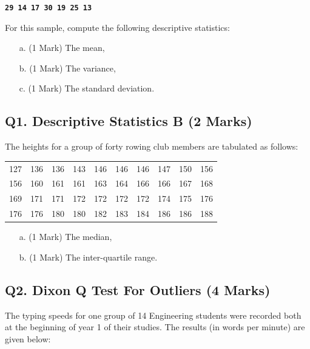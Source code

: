 \documentclass[a4paper,12pt]{article}
\begin{document}
\begin{center}
	\textbf{\texttt{29 14 17 30 19 25 13}}
\end{center}

\noindent For this sample, compute the following descriptive statistics:
\begin{itemize}
	\item[a.] (1 Mark) The mean,
	\item[b.] (1 Mark) The variance,
	\item[c.] (1 Mark) The standard deviation.
\end{itemize}

\subsection*{Q1. Descriptive Statistics B (2 Marks)} %
The heights for a group of forty rowing club members are tabulated as follows:

\begin{table}[ht]
	\begin{center}
		\begin{tabular}{|rrrrrrrrrr|}
			
			\hline
			127& 136& 136& 143& 146& 146& 146& 147& 150& 156\\
			156& 160& 161& 161& 163& 164& 166& 166& 167& 168\\
			169& 171& 171& 172& 172& 172& 172& 174& 175& 176\\
			176& 176& 180& 180& 182& 183& 184& 186& 186& 188\\
			\hline
		\end{tabular}
	\end{center}
\end{table}
\vspace{-0.5cm}
\begin{itemize}
	\item[a.] (1 Mark) The median,
	\item[b.] (1 Mark) The inter-quartile range.
\end{itemize}
\newpage

\subsection*{Q2. Dixon Q Test For Outliers (4 Marks)}



The typing speeds for one group of 14 Engineering students were recorded both at the beginning of year 1 of their studies. The results (in words per minute) are given below:
\end{document}
